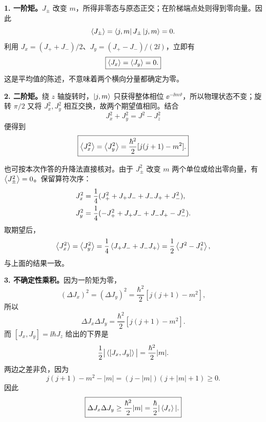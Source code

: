 \begin{checkedsolution}
\textbf{1. 一阶矩。}$J_\pm$ 改变 $m$，所得非零态与原态正交；在阶梯端点处则得到零向量。因此
\begin{equation}
  \left\langle J_\pm \right\rangle=\left\langle j,m\right|J_\pm\left|j,m\right\rangle=0.
\end{equation}
利用 $J_x=(J_++J_-)/2$、$J_y=(J_+-J_-)/(2\ii)$，立即有
\begin{equation}
  \boxed{\left\langle J_x \right\rangle=\left\langle J_y \right\rangle=0.}
\end{equation}
这是平均值的陈述，不意味着两个横向分量都确定为零。

\textbf{2. 二阶矩。}绕 $z$ 轴旋转时，$\left|j,m\right\rangle$ 只获得整体相位 $\ee^{-\ii m\vartheta}$，所以物理状态不变；旋转 $\pi/2$ 又将 $J_x^2,J_y^2$ 相互交换，故两个期望值相同。结合
\begin{equation}
  J_x^2+J_y^2=J^2-J_z^2
\end{equation}
便得到
\begin{equation}
  \boxed{\left\langle J_x^2 \right\rangle=\left\langle J_y^2 \right\rangle
    =\frac{\hbar^2}{2}[j(j+1)-m^2].}
\end{equation}

也可按本次作答的升降法直接核对。由于 $J_\pm^2$ 改变 $m$ 两个单位或给出零向量，有 $\left\langle J_\pm^2 \right\rangle=0$。保留算符次序：
\begin{align}
  J_x^2&=\frac14(J_+^2+J_+J_-+J_-J_++J_-^2),\notag\\
  J_y^2&=\frac14(-J_+^2+J_+J_-+J_-J_+-J_-^2).
\end{align}
取期望后，
\begin{equation}
  \left\langle J_x^2 \right\rangle=\left\langle J_y^2 \right\rangle
   =\frac14\left\langle J_+J_-+J_-J_+ \right\rangle
   =\frac12\left\langle J^2-J_z^2 \right\rangle,
\end{equation}
与上面的结果一致。

\textbf{3. 不确定性乘积。}因为一阶矩为零，
\begin{equation}
  (\Delta J_x)^2=(\Delta J_y)^2
    =\frac{\hbar^2}{2}[j(j+1)-m^2],
\end{equation}
所以
\begin{equation}
  \boxed{\Delta J_x\Delta J_y
    =\frac{\hbar^2}{2}[j(j+1)-m^2].}
\end{equation}
而 $[J_x,J_y]=\ii\hbar J_z$ 给出的下界是
\begin{equation}
  \frac12\big|\left\langle [J_x,J_y] \right\rangle\big|
     =\frac{\hbar^2}{2}|m|.
\end{equation}
两边之差非负，因为
\begin{equation}
  j(j+1)-m^2-|m|
    =(j-|m|)(j+|m|+1)\geq0.
\end{equation}
因此
\begin{equation}
  \boxed{\Delta J_x\Delta J_y
     \geq\frac{\hbar^2}{2}|m|
     =\frac{\hbar}{2}|\left\langle J_z \right\rangle|.}
\end{equation}


\end{checkedsolution}

